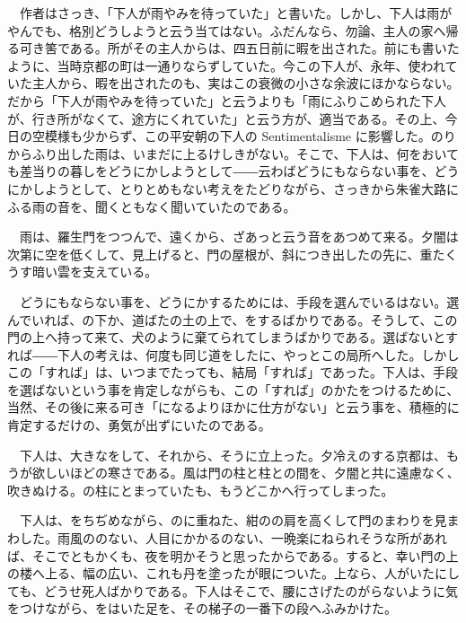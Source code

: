 \documentclass[a4j,twocolumn]{tarticle}
\begin{document}
　作者はさっき、「下人が雨やみを待っていた」と書いた。しかし、下人は雨がやんでも、格別どうしようと云う当てはない。ふだんなら、勿論、主人の家へ帰る可き筈である。所がその主人からは、四五日前に暇を出された。前にも書いたように、当時京都の町は一通りならずしていた。今この下人が、永年、使われていた主人から、暇を出されたのも、実はこの衰微の小さな余波にほかならない。だから「下人が雨やみを待っていた」と云うよりも「雨にふりこめられた下人が、行き所がなくて、途方にくれていた」と云う方が、適当である。その上、今日の空模様も少からず、この平安朝の下人の Sentimentalisme に影響した。のりからふり出した雨は、いまだに上るけしきがない。そこで、下人は、何をおいても差当りの暮しをどうにかしようとして――云わばどうにもならない事を、どうにかしようとして、とりとめもない考えをたどりながら、さっきから朱雀大路にふる雨の音を、聞くともなく聞いていたのである。\par{}
　雨は、羅生門をつつんで、遠くから、ざあっと云う音をあつめて来る。夕闇は次第に空を低くして、見上げると、門の屋根が、斜につき出したの先に、重たくうす暗い雲を支えている。\par{}
　どうにもならない事を、どうにかするためには、手段を選んでいるはない。選んでいれば、の下か、道ばたの土の上で、をするばかりである。そうして、この門の上へ持って来て、犬のように棄てられてしまうばかりである。選ばないとすれば――下人の考えは、何度も同じ道をしたに、やっとこの局所へした。しかしこの「すれば」は、いつまでたっても、結局「すれば」であった。下人は、手段を選ばないという事を肯定しながらも、この「すれば」のかたをつけるために、当然、その後に来る可き「になるよりほかに仕方がない」と云う事を、積極的に肯定するだけの、勇気が出ずにいたのである。\par{}
　下人は、大きなをして、それから、そうに立上った。夕冷えのする京都は、もうが欲しいほどの寒さである。風は門の柱と柱との間を、夕闇と共に遠慮なく、吹きぬける。の柱にとまっていたも、もうどこかへ行ってしまった。\par{}
　下人は、をちぢめながら、のに重ねた、紺のの肩を高くして門のまわりを見まわした。雨風ののない、人目にかかるのない、一晩楽にねられそうな所があれば、そこでともかくも、夜を明かそうと思ったからである。すると、幸い門の上の楼へ上る、幅の広い、これも丹を塗ったが眼についた。上なら、人がいたにしても、どうせ死人ばかりである。下人はそこで、腰にさげたのがらないように気をつけながら、をはいた足を、その梯子の一番下の段へふみかけた。\par{}
\end{document}
